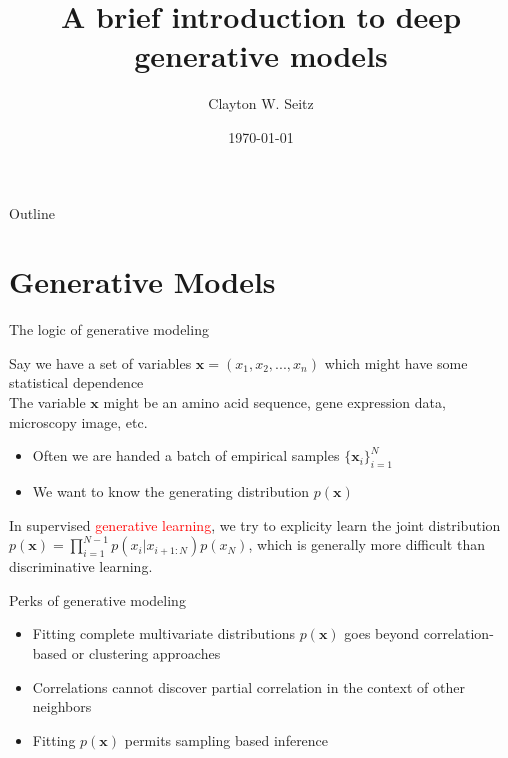 \documentclass{beamer}					%
\title{A brief introduction to deep generative models}	%
\author{Clayton W. Seitz}								%
\date{\today}									%
\begin{document}
\begin{frame}
  \titlepage
\end{frame}

\begin{frame}{Outline}
  \tableofcontents
\end{frame}

%


\section{Generative Models}

\begin{frame}{The logic of generative modeling}

Say we have a set of variables $\mathbf{x} = (x_{1},x_{2},...,x_{n})$ which might have some statistical dependence\\
\vspace{0.1in}
The variable $\mathbf{x}$ might be an amino acid sequence, gene expression data, microscopy image, etc.\\
\vspace{0.1in}
\begin{itemize}
\item Often we are handed a batch of empirical samples $\{\mathbf{x}_{i}\}_{i=1}^{N}$
\item We want to know the generating distribution $p(\mathbf{x})$
\end{itemize}

In supervised \textcolor{red}{generative learning}, we try to explicity learn the joint distribution $p(\mathbf{x}) = \prod_{i=1}^{N-1}p(x_{i}|x_{i+1:N})p(x_{N})$, which is generally more difficult than discriminative learning. 

\end{frame}


\begin{frame}{Perks of generative modeling}

\begin{itemize}
\item Fitting complete multivariate distributions $p(\mathbf{x})$ goes beyond correlation-based or clustering approaches
\item Correlations cannot discover partial correlation in the context of other neighbors
\item Fitting $p(\mathbf{x})$ permits sampling based inference
\end{itemize}

\end{frame}
\end{document}
